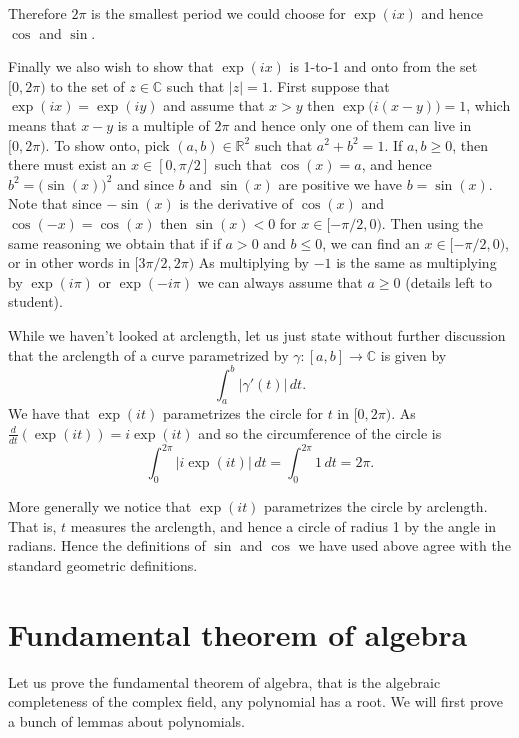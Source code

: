\documentclass[12pt]{book}
\newcommand{\abs}[1]{\left\lvert {#1} \right\rvert}
\newcommand{\C}{{\mathbb{C}}}
\newcommand{\R}{{\mathbb{R}}}
\newcommand{\sectionnewpage}{\clearpage}
\theoremstyle{plain}
\theoremstyle{remark}
\theoremstyle{definition}
\theoremstyle{exercise}
\theoremstyle{example}
\begin{document}
Therefore $2\pi$ is the smallest period we could choose for $\exp(ix)$
and hence $\cos$ and $\sin$.

Finally we also wish to show that $\exp(ix)$ is 1-to-1 and onto
from the set $[0,2\pi)$ to the set of $z \in \C$ such that
$\abs{z} = 1$.  First suppose that $\exp(ix) = \exp(iy)$ and assume that
$x > y$ then
$\exp\bigl(i(x-y)\bigr) = 1$, which means that $x-y$ is a multiple of $2\pi$ and hence
only one of them can live in $[0,2\pi)$.
To show onto, pick $(a,b) \in \R^2$ such that $a^2+b^2 = 1$.
If $a,b \geq 0$, then there must exist an $x \in [0,\pi/2]$ such that
$\cos(x) = a$, and hence $b^2 = \bigl(\sin(x)\bigr)^2$ and since
$b$ and $\sin(x)$ are positive we have $b = \sin(x)$.
Note that since $-\sin(x)$ is the derivative of $\cos(x)$
and $\cos(-x) = \cos(x)$ then $\sin(x) < 0$ for $x \in [-\pi/2,0)$.
Then using the same reasoning we obtain that if
if $a > 0$ and $b \leq 0$, we can find an $x \in [-\pi/2,0)$,
or in other words in $[3\pi/2,2\pi)$
As multiplying by $-1$ is the same as multiplying by $\exp(i\pi)$ or
$\exp(-i\pi)$
we can always assume that $a \geq 0$ (details left to student).

While we haven't looked at arclength, let us just state without
further discussion that
the arclength of a curve parametrized by $\gamma \colon [a,b] \to \C$ is given
by
$$
\int_a^b \abs{\gamma'(t)} \, dt .
$$
We have that $\exp(it)$ parametrizes the circle for $t$ in $[0,2\pi)$.
As $\frac{d}{dt} ( \exp(it) ) = i\exp(it)$ and so the circumference of the
circle is
$$
\int_0^{2\pi} \abs{i \exp(it)} \, dt
=
\int_0^{2\pi} 1 \, dt  = 2\pi .
$$

More generally we notice that $\exp(it)$ parametrizes the circle by arclength.
That is, $t$ measures the arclength, and hence a circle of radius 1 by
the angle in radians.  Hence the definitions of $\sin$ and $\cos$ we have
used above agree with the standard geometric definitions.


\sectionnewpage
\section{Fundamental theorem of algebra}
\label{sec:FIXME}

Let us prove the fundamental theorem of algebra, that is the algebraic
completeness of the complex field, any polynomial has a root.  We will first
prove a bunch of lemmas about polynomials.
\end{document}
